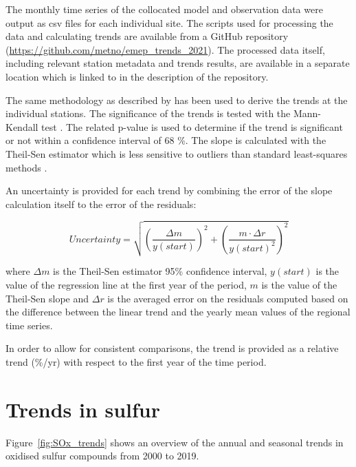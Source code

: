 The monthly time series of the collocated model and observation data were output as csv files for each individual site. The scripts used for processing the data and calculating trends are available from a GitHub repository (\url{https://github.com/metno/emep_trends_2021}). The processed data itself, including relevant station metadata and trends results, are available in a separate location which is linked to in the description of the repository.

The same methodology as described by \cite{aas2019global, mortier2020} has been used to derive the trends at the individual stations. The significance of the trends is tested with the Mann-Kendall test \citep{hamed1998modified}. The related p-value is used to determine if the trend is significant or not within a confidence interval of 68 \%. The slope is calculated with the Theil-Sen estimator which is less sensitive to outliers than standard least-squares methods \citep{sen1968estimates}.

An uncertainty is provided for each trend by combining the error of the slope calculation itself to the error of the residuals:

\begin{equation}
 Uncertainty = \sqrt{{\left (\frac{\Delta m}{y(start)}\right )}^{2} + {\left ( \frac{m \cdot \Delta r}{y(start)^2}\right )}^{2} }
\end{equation}

where $\Delta m$ is the Theil-Sen estimator 95\% confidence interval, $y(start)$ is the value of the regression line at the first year of the period, $m$ is the value of the Theil-Sen slope and $\Delta r$ is the averaged error on the residuals computed based on the difference between the linear trend and the yearly mean values of the regional time series.

In order to allow for consistent comparisons, the trend is provided as a relative trend (\%/yr) with respect to the first year of the time period.



\section{\label{sec:Trends_sulfur}Trends in sulfur}

Figure~\ref{fig:SOx_trends} shows an overview of the annual and seasonal trends in oxidised sulfur compounds from 2000 to 2019.

